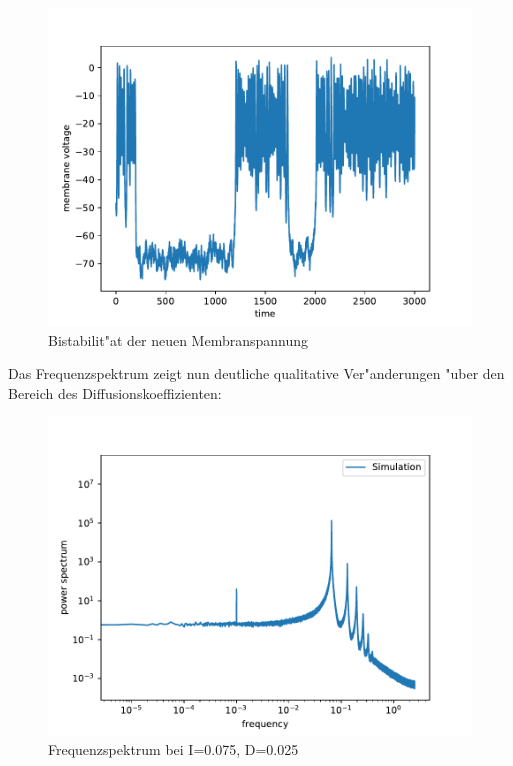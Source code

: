 \documentclass[12pt,a4paper]{article}
\begin{document}
\begin{figure}[H]
	\centering
	\includegraphics[scale=0.9]{realstate2.pdf}
	\caption{Bistabilit"at der neuen Membranspannung}
	\label{realburst}
\end{figure}
Das Frequenzspektrum zeigt nun deutliche qualitative Ver"anderungen "uber den Bereich des Diffusionskoeffizienten:
\begin{figure}[H]
	\centering
	\includegraphics[scale=0.9]{inapik7jjem2111.pdf}
	\caption{Frequenzspektrum bei I=0.075, D=0.025}
	\label{spectrum}
\end{figure}
\end{document}
